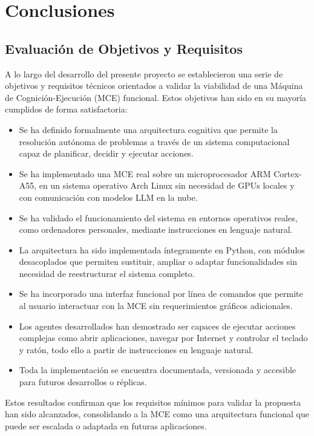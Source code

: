 \chapter{Conclusiones}

\section{Evaluación de Objetivos y Requisitos}

A lo largo del desarrollo del presente proyecto se establecieron una serie de
objetivos y requisitos técnicos orientados a validar la viabilidad de una
Máquina de Cognición-Ejecución (MCE) funcional. 
Estos objetivos han sido en su mayoría cumplidos de forma satisfactoria:

\begin{itemize}
    \item Se ha definido formalmente una arquitectura cognitiva que permite la
    resolución autónoma de problemas a través de un sistema computacional capaz
    de planificar, decidir y ejecutar acciones.
    \item Se ha implementado una MCE real sobre un microprocesador ARM 
    Cortex-A55, en un sistema operativo Arch Linux sin necesidad de 
    GPUs locales y con comunicación con modelos LLM en la nube.
    \item Se ha validado el funcionamiento del sistema en entornos 
    operativos reales, como ordenadores personales, mediante 
    instrucciones en lenguaje natural.
    \item La arquitectura ha sido implementada íntegramente en Python, con módulos
    desacoplados que permiten sustituir, ampliar o adaptar funcionalidades sin
    necesidad de reestructurar el sistema completo.
    \item Se ha incorporado una interfaz funcional por línea de comandos 
    que permite al usuario interactuar con la MCE sin requerimientos 
    gráficos adicionales.
    \item Los agentes desarrollados han demostrado ser capaces de ejecutar
    acciones complejas como abrir aplicaciones, navegar por Internet y controlar
    el teclado y ratón, todo ello a partir de instrucciones en lenguaje natural.
    \item Toda la implementación se encuentra documentada, versionada y
    accesible para futuros desarrollos o réplicas.
\end{itemize}

Estos resultados confirman que los requisitos mínimos para validar la propuesta
han sido alcanzados, consolidando a la MCE como una arquitectura funcional que
puede ser escalada o adaptada en futuras aplicaciones.


